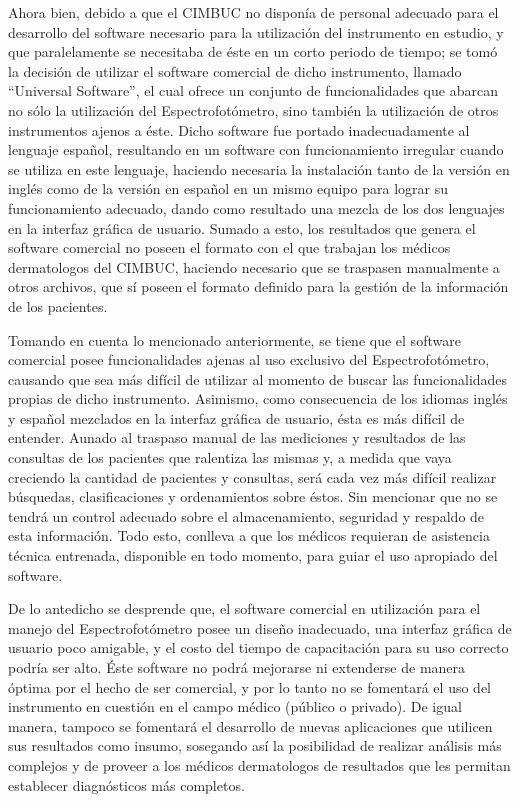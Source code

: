\documentclass[12pt, a4paper]{article}
\begin{document}
Ahora bien, debido a que el CIMBUC no dispon\'{i}a de personal adecuado para el desarrollo del software necesario para la utilizaci\'{o}n del instrumento en estudio, y que paralelamente se necesitaba de \'{e}ste en un corto periodo de tiempo; se tom\'{o} la decisi\'{o}n de utilizar el software comercial de dicho instrumento, llamado ``Universal Software'', el cual ofrece un conjunto de funcionalidades que abarcan no s\'{o}lo la utilizaci\'{o}n del Espectrofot\'{o}metro, sino tambi\'{e}n la utilizaci\'{o}n de otros instrumentos ajenos a \'{e}ste. Dicho software fue portado inadecuadamente al lenguaje espa\~{n}ol, resultando en un software con funcionamiento irregular cuando se utiliza en este lenguaje, haciendo necesaria la instalaci\'{o}n tanto de la versi\'{o}n en ingl\'{e}s como de la versi\'{o}n en espa\~{n}ol en un mismo equipo para lograr su funcionamiento adecuado, dando como resultado una mezcla de los dos lenguajes en la interfaz gr\'{a}fica de usuario. Sumado a esto, los resultados que genera el software comercial no poseen el formato con el que trabajan los m\'{e}dicos dermatologos del CIMBUC, haciendo necesario que se traspasen manualmente a otros archivos, que s\'{i} poseen el formato definido para la gesti\'{o}n de la informaci\'{o}n de los pacientes.

Tomando en cuenta lo mencionado anteriormente, se tiene que el software comercial posee funcionalidades ajenas al uso exclusivo del Espectrofot\'{o}metro, causando que sea m\'{a}s dif\'{i}cil de utilizar al momento de buscar las funcionalidades propias de dicho instrumento. Asimismo, como consecuencia de los idiomas ingl\'{e}s y espa\~{n}ol mezclados en la interfaz gr\'{a}fica de usuario, \'{e}sta es m\'{a}s dif\'{i}cil de entender. Aunado al traspaso manual de las mediciones y resultados de las consultas de los pacientes que ralentiza las mismas y, a medida que vaya creciendo la cantidad de pacientes y consultas, ser\'{a} cada vez m\'{a}s dif\'{i}cil realizar b\'{u}squedas, clasificaciones y ordenamientos sobre \'{e}stos. Sin mencionar que no se tendr\'{a} un control adecuado sobre el almacenamiento, seguridad y respaldo de esta informaci\'{o}n. Todo esto, conlleva a que los m\'{e}dicos requieran de asistencia t\'{e}cnica entrenada, disponible en todo momento, para guiar el uso apropiado del software.

De lo antedicho se desprende que, el software comercial en utilizaci\'{o}n para el manejo del Espectrofot\'{o}metro posee un dise\~{n}o inadecuado, una interfaz gr\'{a}fica de usuario poco amigable, y el costo del tiempo de capacitaci\'{o}n para su uso correcto podr\'{i}a ser alto. \'{E}ste software no podr\'{a} mejorarse ni extenderse de manera \'{o}ptima por el hecho de ser comercial, y por lo tanto no se fomentar\'{a} el uso del instrumento en cuesti\'{o}n en el campo m\'{e}dico (p\'{u}blico o privado). De igual manera, tampoco se fomentar\'{a} el desarrollo de nuevas aplicaciones que utilicen sus resultados como insumo, sosegando as\'{i} la posibilidad de realizar an\'{a}lisis m\'{a}s complejos y de proveer a los m\'{e}dicos dermatologos de resultados que les permitan establecer diagn\'{o}sticos m\'{a}s completos.
\end{document}

